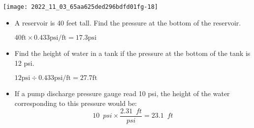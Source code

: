 \begin{center}
\texttt{[image: 2022\_11\_03\_65aa625ded296bdfd01fg-18]}
\end{center}


\begin{itemize}
\item A reservoir is 40 feet tall. Find the pressure at the bottom of the reservoir.

$40 \mathrm{ft} \times 0.433 \mathrm{psi} / \mathrm{ft}=17.3 \mathrm{psi}$

\vspace{0.4cm}

\item Find the height of water in a tank if the pressure at the bottom of the tank is 12 psi.

$12 \mathrm{psi} \div 0.433 \mathrm{psi} / \mathrm{ft}=27.7 \mathrm{ft}$

\vspace{0.4cm}

\item If a pump discharge pressure gauge read 10 psi, the height of the water corresponding to this pressure would be:
$$10 \enspace psi \times \dfrac{2.31 \enspace ft}{psi}=23.1 \enspace ft$$\\
\vspace{0.4cm}
\end{itemize}












